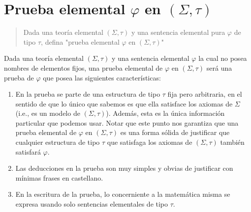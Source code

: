 \documentclass{article}
\begin{document}
\section{Prueba elemental $\varphi$ en $(\Sigma,\tau)$}
\begin{quote}
  Dada una teoría elemental $(\Sigma,\tau)$ y una sentencia elemental pura $\varphi$ de tipo $\tau$, defina "prueba elemental $\varphi$ en $(\Sigma,\tau)$"
\end{quote}
Dada una teoría elemental $(\Sigma,\tau)$ y una sentencia elemental $\varphi$ la cual no posea nombres de elementos fijos, una prueba elemental de $\varphi$ en $(\Sigma,\tau)$ será una prueba de $\varphi$ que posea las siguientes características:
\begin{enumerate}
  \item En la prueba se parte de una estructura de tipo $\tau$ fija pero arbitraria, en el sentido de que lo único que sabemos es que ella satisface los axiomas de $\Sigma$ (i.e., es un modelo de $(\Sigma,\tau)$).
        \newline
        Además, esta es la única información particular que podemos usar.
        \newline
        Notar que este punto nos garantiza que una prueba elemental de $\varphi$ en $(\Sigma,\tau)$ es una forma sólida de justificar que cualquier estructura de tipo $\tau$ que satisfaga los axiomas de $(\Sigma,\tau)$ también satisfará $\varphi$.
  \item Las deducciones en la prueba son muy simples y obvias de justificar con mínimas frases en castellano.
  \item En la escritura de la prueba, lo concerniente a la matemática misma se expresa usando solo sentencias elementales de tipo $\tau$.
\end{enumerate}
\end{document}
